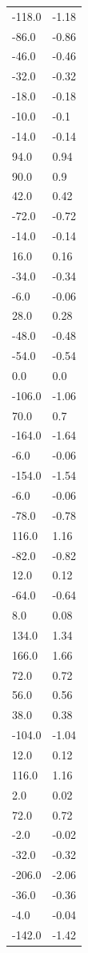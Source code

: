 \begin{longtable}{ll}
-118.0 & -1.18 \\
-86.0 & -0.86 \\
-46.0 & -0.46 \\
-32.0 & -0.32 \\
-18.0 & -0.18 \\
-10.0 & -0.1 \\
-14.0 & -0.14 \\
94.0 & 0.94 \\
90.0 & 0.9 \\
42.0 & 0.42 \\
-72.0 & -0.72 \\
-14.0 & -0.14 \\
16.0 & 0.16 \\
-34.0 & -0.34 \\
-6.0 & -0.06 \\
28.0 & 0.28 \\
-48.0 & -0.48 \\
-54.0 & -0.54 \\
0.0 & 0.0 \\
-106.0 & -1.06 \\
70.0 & 0.7 \\
-164.0 & -1.64 \\
-6.0 & -0.06 \\
-154.0 & -1.54 \\
-6.0 & -0.06 \\
-78.0 & -0.78 \\
116.0 & 1.16 \\
-82.0 & -0.82 \\
12.0 & 0.12 \\
-64.0 & -0.64 \\
8.0 & 0.08 \\
134.0 & 1.34 \\
166.0 & 1.66 \\
72.0 & 0.72 \\
56.0 & 0.56 \\
38.0 & 0.38 \\
-104.0 & -1.04 \\
12.0 & 0.12 \\
116.0 & 1.16 \\
2.0 & 0.02 \\
72.0 & 0.72 \\
-2.0 & -0.02 \\
-32.0 & -0.32 \\
-206.0 & -2.06 \\
-36.0 & -0.36 \\
-4.0 & -0.04 \\
-142.0 & -1.42 \\

\end{longtable}
